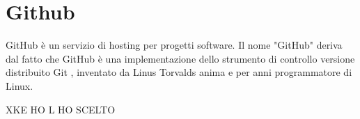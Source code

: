 \section{Github}
\label{sec:github}
GitHub è un servizio di hosting per progetti software. Il nome "GitHub" deriva dal fatto che GitHub è una implementazione dello strumento di controllo versione distribuito Git \cite{git:wiki}, inventato da Linus Torvalds anima e per anni programmatore di Linux. 




XKE HO L HO SCELTO